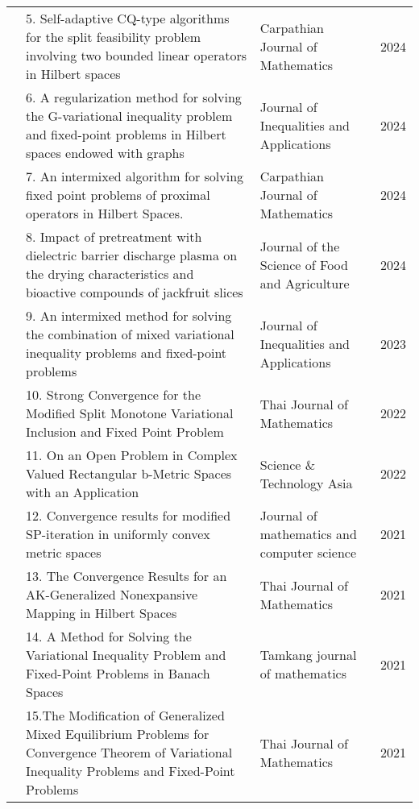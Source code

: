 {{\begin{center}
\begin{longtable}{|p{}|>{\raggedright}p{}|>{\raggedright}p{}|p{}|}
&5. Self-adaptive CQ-type 
algorithms for the split 
feasibility problem 
involving two bounded
linear operators in
Hilbert spaces
&Carpathian 
Journal of 
Mathematics &
2024 \\ \cline{2-4}

&6. A regularization method
for solving the G-variational
inequality problem and 
fixed-point problems in 
Hilbert spaces endowed with
graphs
&Journal of 
Inequalities and 
Applications
&2024 
\\ \cline{2-4}


&7. An intermixed algorithm 
for solving fixed point 
problems of proximal
operators in Hilbert Spaces.
&Carpathian Journal 
of Mathematics
&2024 \\ \cline{2-4}		


&8. Impact of pretreatment 
with dielectric barrier
discharge plasma on the
drying characteristics and 
bioactive compounds of 
jackfruit slices
&Journal of the Science 
of Food and Agriculture
&2024 \\ \cline{2-4}
			
&9. An intermixed
method for solving
the combination 
of mixed variational 
inequality problems
and fixed-point
problems
&Journal of 
Inequalities and
Applications
& 2023 
\\ \cline{2-4}		

&10.	Strong Convergence 
for the Modified 
Split Monotone 
Variational Inclusion
and Fixed Point	Problem
&Thai Journal 
of Mathematics&
2022 
\\ \cline{2-4}	

&11.	On an Open
Problem in Complex 
Valued Rectangular 
b-Metric Spaces 
with an Application
&Science \& Technology Asia
&2022 \\ \cline{2-4}

	
&12. Convergence results
for modified SP-iteration
in uniformly convex metric spaces
&Journal of 
mathematics 
and computer 
science
&2021 \\ \cline{2-4}
	
&13. The Convergence Results for an 
AK-Generalized Nonexpansive
Mapping in Hilbert Spaces
&Thai Journal
of Mathematics
&2021 \\ \cline{2-4}

&14. A Method for Solving
the Variational Inequality 
Problem and Fixed-Point 
Problems in Banach Spaces
&Tamkang journal
of mathematics&
2021\\\cline{2-4}
	
&15.The Modification of 
Generalized Mixed 
Equilibrium Problems
for Convergence 
Theorem of Variational
Inequality Problems 
and Fixed-Point 
Problems
&Thai Journal 
of Mathematics
&2021\\\cline{2-4}


\end{longtable}
\end{center}}}
